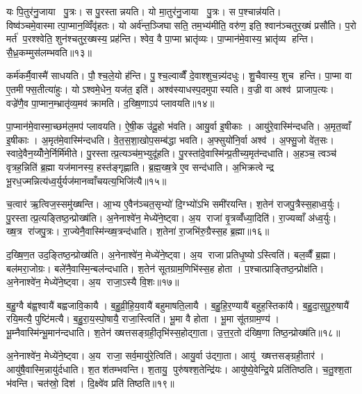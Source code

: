 यः पि॒तुर॑नु॒जाया पु॒त्रः। स पु॒रस्तान्नयति। यो मा॒तुर॑नु॒जाया पु॒त्रः। स प॒श्चान्न॑यति। विष्व॑ञ्चमे॒वास्मात्पा॒प्मान॒व्विँवृ॑हतः। यो अर्व॑न्त॒ञ्जिघासति॒ तम॒भ्य॑मीति॒ वरु॑ण॒ इति॒ श्वान॑ञ्चतुर॒ख्षं प्रसौ॑ति। प॒रो मर्त॑ प॒रश्श्वेति॒ शुन॑श्चतुर॒ख्षस्य॒ प्रह॑न्ति। श्वेव॒ वै पा॒प्मा भ्रातृ॑व्यः। पा॒प्मान॑मे॒वास्य॒ भ्रातृ॑व्य हन्ति। सै॒ध्र॒कम्मुस॑लम्भवति॥१३॥

कर्म॑कर्मै॒वास्मै॑ साधयति। पौ॒श्च॒ले॒यो ह॑न्ति। पु॒श्च॒ल्वाव्वैँ दे॒वाश्शुच॒न्न्य॑दधुः। शु॒चैवास्य॒ शुच हन्ति। पा॒प्मा वा ए॒तमीफ्स॒तीत्या॑हुः। योऽश्वमे॒धेन॒ यज॑त॒ इति॑। अश्व॑स्याधस्प॒दमुपास्यति। व॒ज्री वा अश्व॑ प्राजाप॒त्यः। वज्रे॑णै॒व पा॒प्मान॒म्भ्रातृ॑व्य॒मव॑ क्रामति। द॒ख्षि॒णाऽप॑ प्लावयति॥१४॥

पा॒प्मान॑मे॒वास्मा॒च्छम॑ल॒मप॑ प्लावयति। ऐ॒षी॒क उ॑दू॒हो भ॑वति। आयु॒र्वा इ॒षीकाः। आयु॑रे॒वास्मि॑न्दधति। अ॒मृत॒व्वाँ इ॒षीकाः। अ॒मृत॑मे॒वास्मि॑न्दधति। वे॒त॒स॒शा॒खोप॒सम्ब॑द्धा भवति। अ॒फ्सुयो॑नि॒र्वा अश्व॑। अ॒फ्सु॒जो वे॑त॒सः। स्वादे॒वैन॒य्योँने॒र्निर्मि॑मीते। पु॒रस्तात्प्र॒त्यञ्च॑म॒भ्युदू॑हति। पु॒रस्ता॑दे॒वास्मि॑न्प्र॒तीच्य॒मृत॑न्दधाति। अ॒हञ्च॒ त्वञ्च॑ वृत्रह॒न्निति॑ ब्र॒ह्मा यज॑मानस्य॒ हस्त॑ङ्गृह्णाति। ब्र॒ह्म॒ख्ष॒त्रे ए॒व सन्द॑धाति। अ॒भिक्रत्वेन्द्र भू॒रध॒ज्मन्नित्य॑ध्व॒र्युर्यज॑मानव्वाँचयत्य॒भिजि॑त्यै॥१५॥\anuvakamend[भ॒व॒ति॒ प्ला॒व॒य॒ति॒ मि॒मी॒ते॒ पञ्च॑ च]

च॒त्वार॑ ऋ॒त्विज॒स्समु॑ख्षन्ति। आ॒भ्य ए॒वैन॑ञ्चत॒सृभ्यो॑ दि॒ग्भ्यो॑ऽभि समी॑रयन्ति। श॒तेन॑ राजपु॒त्रैस्स॒हाध्व॒र्युः। पु॒रस्तात्प्र॒त्यङ्तिष्ठ॒न्प्रोख्ष॑ति। अ॒नेनाश्वे॑न॒ मेध्ये॑ने॒ष्ट्वा। अ॒य राजा॑ वृ॒त्रव्वँ॑ध्या॒दिति॑। रा॒ज्यव्वाँ अ॑ध्व॒र्युः। ख्ष॒त्र रा॑जपु॒त्रः। रा॒ज्येनै॒वास्मि॑न्ख्ष॒त्रन्द॑धाति। श॒तेना॑ रा॒जभि॑रु॒ग्रैस्स॒ह ब्र॒ह्मा॥१६॥

द॒ख्षि॒ण॒त उद॒ङ्तिष्ठ॒न्प्रोख्ष॑ति। अ॒नेनाश्वे॑न॒ मेध्ये॑ने॒ष्ट्वा। अ॒य राजाप्रतिधृ॒ष्योऽस्त्विति॑। बल॒व्वैँ ब्र॒ह्मा। बल॑मरा॒जोग्रः। बले॑नै॒वास्मि॒न्बल॑न्दधाति। श॒तेन॑ सूतग्राम॒णिभि॑स्स॒ह होता। प॒श्चात्प्राङ्तिष्ठ॒न्प्रोक्ष॑ति। अ॒नेनाश्वे॑न॒ मेध्ये॑ने॒ष्ट्वा। अ॒य राजा॒ऽस्यै वि॒शः॥१७॥

ब॒हु॒ग्वै ब॑ह्व॒श्वायै॑ बह्वजावि॒कायै। ब॒हु॒व्री॒हि॒य॒वायै॑ बहुमाषति॒लायै। ब॒हु॒हि॒र॒ण्यायै॑ बहुह॒स्तिका॑यै। ब॒हु॒दा॒स॒पू॒रु॒षायै॑ रयि॒मत्यै॒ पुष्टि॑मत्यै। ब॒हु॒रा॒य॒स्पो॒षायै॒ राजा॒स्त्विति॑। भू॒मा वै होता। भू॒मा सू॑तग्राम॒ण्य॑। भू॒म्नैवास्मि॑न्भू॒मान॑न्दधाति। श॒तेन॑ ख्षत्तसङ्ग्रही॒तृभि॑स्स॒होद्गा॒ता। उ॒त्त॒र॒तो द॑ख्षि॒णा तिष्ठ॒न्प्रोख्ष॑ति॥१८॥

अ॒नेनाश्वे॑न॒ मेध्ये॑ने॒ष्ट्वा। अ॒य राजा॒ सर्व॒मायु॑रे॒त्विति॑। आयु॒र्वा उ॑द्गा॒ता। आयु॑ ख्षत्तसङ्ग्रही॒तार॑। आयु॑षै॒वास्मि॒न्नायु॑र्दधाति। श॒तश॑तम्भवन्ति। श॒तायु॒ पुरु॑षश्श॒तेन्द्रि॑यः। आयु॑ष्ये॒वेन्द्रि॒ये प्रति॑तिष्ठति। च॒तु॒श्श॒ता भ॑वन्ति। चत॑स्रो॒ दिश॑। दि॒क्ष्वे॑व प्रति॑ तिष्ठति॥१९॥\anuvakamend[ब्र॒ह्मा वि॒श उ॑ख्षति॒ दिश॒ एक॑ञ्च]

